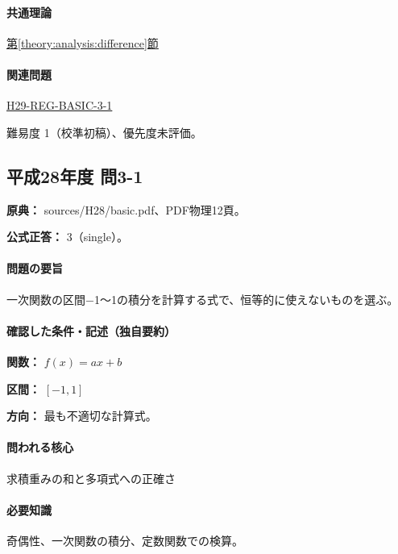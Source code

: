 \paragraph{共通理論} \hyperref[theory:analysis:difference]{第\ref*{theory:analysis:difference}節}

\paragraph{関連問題} \hyperref[q:h29-reg-basic-3-1]{H29-REG-BASIC-3-1}

\par 難易度 1（校準初稿）、優先度未評価。

\subsection{平成28年度 問3-1}
\label{q:h28-reg-basic-3-1}

\noindent\textbf{原典：} sources/H28/basic.pdf、PDF物理12頁。

\textbf{公式正答：} 3（single）。

\paragraph{問題の要旨} 一次関数の区間−1〜1の積分を計算する式で、恒等的に使えないものを選ぶ。

\paragraph{確認した条件・記述（独自要約）}\mbox{}\par

\noindent\textbf{関数：} \(f(x)=ax+b\)\par

\noindent\textbf{区間：} \([-1,1]\)\par

\noindent\textbf{方向：} 最も不適切な計算式。\par

\paragraph{問われる核心} 求積重みの和と多項式への正確さ

\paragraph{必要知識} 奇偶性、一次関数の積分、定数関数での検算。

